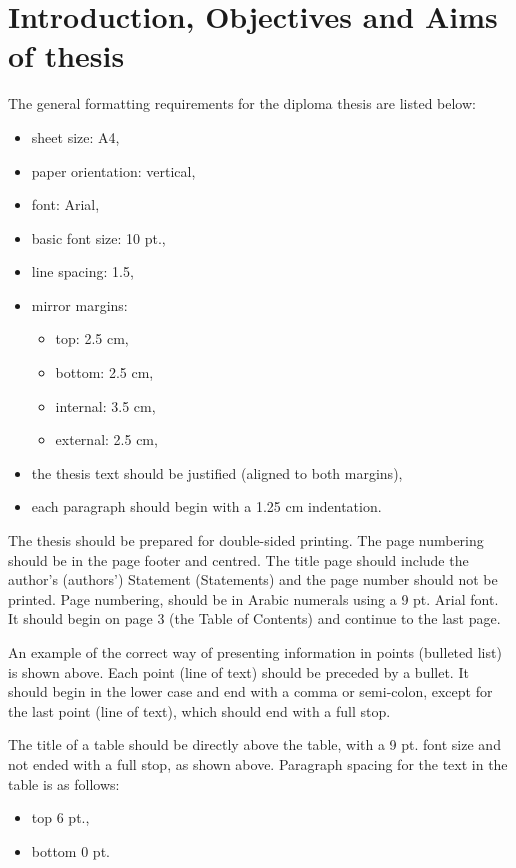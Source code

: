 \chapter{Introduction, Objectives and Aims of thesis}

The general formatting requirements for the diploma thesis are listed below:
\begin{itemize}
	\item sheet size: A4,
	\item paper orientation: vertical,
	\item font: Arial,
	\item basic font size: 10 pt.,
	\item line spacing: 1.5,
	\item mirror margins:
	\begin{itemize}
		\item top: 2.5 cm,
		\item bottom: 2.5 cm,
		\item internal: 3.5 cm,
		\item external: 2.5 cm,
	\end{itemize}
	\item the thesis text should be justified (aligned to both margins),
	\item each paragraph should begin with a 1.25 cm indentation.
\end{itemize}

The thesis should be prepared for double-sided printing. The page numbering should be in the page footer and centred. The title page should include the author’s (authors’) Statement (Statements) and the page number should not be printed. Page numbering, should be in Arabic numerals using a 9 pt. Arial font. It should begin on page 3 (the Table of Contents) and continue to the last page.

An example of the correct way of presenting information in points (bulleted list) is shown above. Each point (line of text) should be preceded by a bullet. It should begin in the lower case and end with a comma or semi-colon, except for the last point (line of text), which should end with a full stop.

The title of a table should be directly above the table, with a 9 pt. font size and not ended with a full stop, as shown above. Paragraph spacing for the text in the table is as follows:
\begin{itemize}
	\item top 6 pt.,
	\item bottom 0 pt.
\end{itemize}

